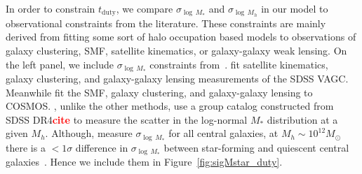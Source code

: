 \documentclass[12pt, letterpaper, preprint, tighten]{aastex}
\newcommand{\todo}[1]{{\bf \textcolor{red}{#1}}}
\begin{document}
In order to constrain $t_\mathrm{duty}$, we compare $\sigma_{\log\,M_*}$ and 
$\sigma_{\log\,M_h}$ in our model to observational constraints from the 
literature. These constraints are mainly derived from fitting some sort of halo 
occupation based models to observations of galaxy clustering, SMF, satellite 
kinematics, or galaxy-galaxy weak lensing. On the left panel, we include 
$\sigma_{\log\,M_*}$ constraints from~\cite{yang2009, more2011, leauthaud2012, tinker2013, zu2015}. 
\cite{more2011, zu2015} fit satellite kinematics, galaxy clustering, and 
galaxy-galaxy lensing measurements of the SDSS VAGC. Meanwhile 
\cite{leauthaud2012, tinker2013} fit the SMF, galaxy clustering, and galaxy-galaxy 
lensing to COSMOS. \cite{yang2009}, unlike the other methods, use a group catalog 
constructed from SDSS DR4\todo{cite} to measure the scatter in the log-normal $M_*$ 
distribution at a given $M_h$. Although, \cite{leauthaud2012, zu2015} measure 
$\sigma_{\log\,M_*}$ for all central galaxies, at $M_h\sim 10^{12}M_\odot$ there 
is a $< 1\sigma$ difference in $\sigma_{\log\,M_*}$ between star-forming and 
quiescent central galaxies~\citep{yang2009, more2011, tinker2013}. Hence we 
include them in Figure~\ref{fig:sigMstar_duty}. 
\end{document}
